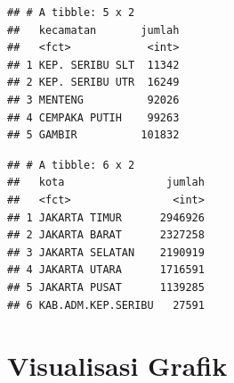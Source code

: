 \documentclass[openany]{book}
\newenvironment{Shaded}{\begin{snugshade}}{\end{snugshade}}
\newcommand{\KeywordTok}[1]{\textcolor[rgb]{0.13,0.29,0.53}{\textbf{#1}}}
\newcommand{\DataTypeTok}[1]{\textcolor[rgb]{0.13,0.29,0.53}{#1}}
\newcommand{\DecValTok}[1]{\textcolor[rgb]{0.00,0.00,0.81}{#1}}
\newcommand{\StringTok}[1]{\textcolor[rgb]{0.31,0.60,0.02}{#1}}
\newcommand{\CommentTok}[1]{\textcolor[rgb]{0.56,0.35,0.01}{\textit{#1}}}
\newcommand{\OperatorTok}[1]{\textcolor[rgb]{0.81,0.36,0.00}{\textbf{#1}}}
\newcommand{\NormalTok}[1]{#1}
\begin{document}
\begin{Shaded}
\end{Shaded}

\begin{verbatim}
## # A tibble: 5 x 2
##   kecamatan       jumlah
##   <fct>            <int>
## 1 KEP. SERIBU SLT  11342
## 2 KEP. SERIBU UTR  16249
## 3 MENTENG          92026
## 4 CEMPAKA PUTIH    99263
## 5 GAMBIR          101832
\end{verbatim}

\begin{Shaded}
\end{Shaded}

\begin{verbatim}
## # A tibble: 6 x 2
##   kota                jumlah
##   <fct>                <int>
## 1 JAKARTA TIMUR      2946926
## 2 JAKARTA BARAT      2327258
## 3 JAKARTA SELATAN    2190919
## 4 JAKARTA UTARA      1716591
## 5 JAKARTA PUSAT      1139285
## 6 KAB.ADM.KEP.SERIBU   27591
\end{verbatim}

\section{Visualisasi Grafik}\label{visualisasi-grafik}
\end{document}
